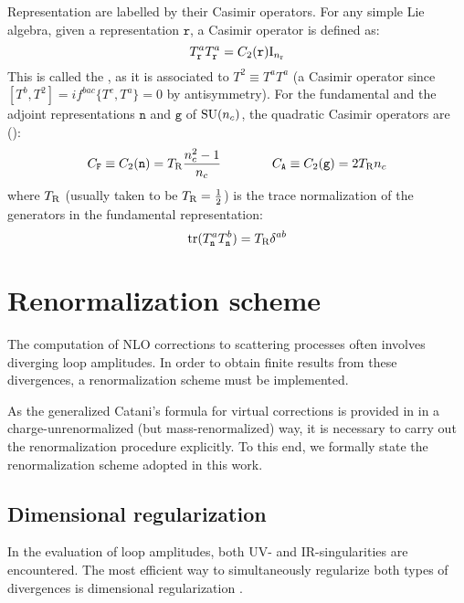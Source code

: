 Representation are labelled by their Casimir operators. For any simple Lie algebra, given a representation $ \mathtt{r} $, a Casimir operator is defined as:
\begin{equation}
  T^a_\mathtt{r} T^a_\mathtt{r} = C_2(\mathtt{r}) \mathrm{I}_{n_{\mathtt{r}}}
  \label{eq:quad-cas}
\end{equation}
This is called the , as it is associated to $ T^2 \equiv T^a T^a $ (a Casimir operator since $ [T^b, T^2] = i f^{bac} \{T^c,T^a\} = 0 $ by antisymmetry). For the fundamental and the adjoint representations $ \mathtt{n} $ and $ \mathtt{g} $ of $ \mathrm{SU}(n_c) $, the quadratic Casimir operators are ():
\begin{equation}
  C_\mathtt{F} \equiv C_2(\mathtt{n}) = T_\text{R} \frac{n_c^2 - 1}{n_c}
  \qquad \qquad
  C_\mathtt{A} \equiv C_2(\mathtt{g}) = 2T_\text{R} n_c
  \label{eq:cas-sun}
\end{equation}
where $ T_\text{R} $ (usually taken to be $ T_\text{R} = \frac{1}{2} $) is the trace normalization of the generators in the fundamental representation:
\begin{equation}
  \operatorname{tr} (T^a_\mathtt{n} T^b_\mathtt{n}) = T_\text{R} \delta^{ab}
  \label{eq:diag-norm}
\end{equation}

\section{Renormalization scheme}
\label{sec:renorm}

The computation of NLO corrections to scattering processes often involves diverging loop amplitudes. In order to obtain finite results from these divergences, a renormalization scheme must be implemented.

As the generalized Catani's formula for virtual corrections is provided in \cite{Catani-2001} in a charge-unrenormalized (but mass-renormalized) way, it is necessary to carry out the renormalization procedure explicitly. To this end, we formally state the renormalization scheme adopted in this work.

\subsection{Dimensional regularization}
\label{ssec:dim-reg}

In the evaluation of loop amplitudes, both UV- and IR-singularities are encountered. The most efficient way to simultaneously regularize both types of divergences is dimensional regularization \cite{dim-reg}.

